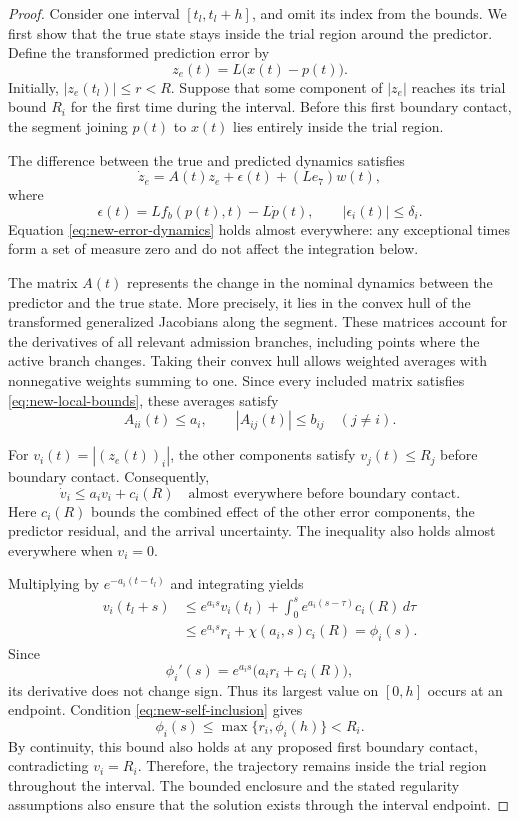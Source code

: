 \documentclass[preprint,12pt]{elsarticle}
\begin{document}
\begin{proof}
Consider one interval $[t_l,t_l+h]$, and omit its index from the
bounds. We first show that the true state stays inside the trial
region around the predictor. Define the transformed prediction error
by
\[
 z_e(t)=L\bigl(x(t)-p(t)\bigr).
\]
Initially, $|z_e(t_l)|\le r<R$. Suppose that some component of
$|z_e|$ reaches its trial bound $R_i$ for the first time during
the interval. Before this first boundary contact, the segment
joining $p(t)$ to $x(t)$ lies entirely inside the trial region.

The difference between the true and predicted dynamics satisfies
\begin{equation}
 \dot z_e=A(t)z_e+\epsilon(t)+(Le_7)w(t),
 \label{eq:new-error-dynamics}
\end{equation}
where
\[
 \epsilon(t)=Lf_b(p(t),t)-L\dot p(t),
 \qquad |\epsilon_i(t)|\le\delta_i.
\]
Equation \eqref{eq:new-error-dynamics} holds almost everywhere:
any exceptional times form a set of measure zero and do not affect
the integration below.

The matrix $A(t)$ represents the change in the nominal dynamics
between the predictor and the true state. More precisely, it lies
in the convex hull of the transformed generalized Jacobians along
the segment. These matrices account for the derivatives of all
relevant admission branches, including points where the active
branch changes. Taking their convex hull allows weighted averages
with nonnegative weights summing to one. Since every included
matrix satisfies \eqref{eq:new-local-bounds}, these averages satisfy
\[
 A_{ii}(t)\le a_i,
 \qquad |A_{ij}(t)|\le b_{ij}\quad(j\ne i).
\]

For $v_i(t)=|(z_e(t))_i|$, the other components satisfy
$v_j(t)\le R_j$ before boundary contact. Consequently,
\begin{equation}
 \dot v_i\le a_i v_i+c_i(R)
 \quad\text{almost everywhere before boundary contact}.
 \label{eq:new-error-comparison-proof}
\end{equation}
Here $c_i(R)$ bounds the combined effect of the other error
components, the predictor residual, and the arrival uncertainty.
The inequality also holds almost everywhere when $v_i=0$.

Multiplying by $e^{-a_i(t-t_l)}$ and integrating yields
\[
\begin{aligned}
 v_i(t_l+s)
 &\le e^{a_i s}v_i(t_l)
      +\int_0^s e^{a_i(s-\tau)}c_i(R)\,d\tau\\
 &\le e^{a_i s}r_i+\chi(a_i,s)c_i(R)
  =\phi_i(s).
\end{aligned}
\]
Since
\[
 \phi_i'(s)=e^{a_i s}\bigl(a_i r_i+c_i(R)\bigr),
\]
its derivative does not change sign. Thus its largest value on
$[0,h]$ occurs at an endpoint. Condition
\eqref{eq:new-self-inclusion} gives
\[
 \phi_i(s)\le\max\{r_i,\phi_i(h)\}<R_i.
\]
By continuity, this bound also holds at any proposed first
boundary contact, contradicting $v_i=R_i$. Therefore, the
trajectory remains inside the trial region throughout the interval.
The bounded enclosure and the stated regularity assumptions also
ensure that the solution exists through the interval endpoint.


\end{proof}
\end{document}
